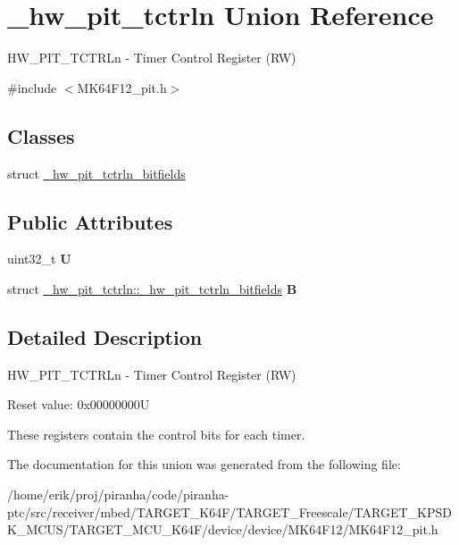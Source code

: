 \hypertarget{union__hw__pit__tctrln}{}\section{\+\_\+hw\+\_\+pit\+\_\+tctrln Union Reference}
\label{union__hw__pit__tctrln}


H\+W\+\_\+\+P\+I\+T\+\_\+\+T\+C\+T\+R\+Ln -\/ Timer Control Register (RW)  




{\ttfamily \#include $<$M\+K64\+F12\+\_\+pit.\+h$>$}

\subsection*{Classes}
\begin{DoxyCompactItemize}
\item 
struct \hyperlink{struct__hw__pit__tctrln_1_1__hw__pit__tctrln__bitfields}{\+\_\+hw\+\_\+pit\+\_\+tctrln\+\_\+bitfields}
\end{DoxyCompactItemize}
\subsection*{Public Attributes}
\begin{DoxyCompactItemize}
\item 
uint32\+\_\+t {\bfseries U}\hypertarget{union__hw__pit__tctrln_ad2a633ac922811734e79e02253bac6cf}{}\label{union__hw__pit__tctrln_ad2a633ac922811734e79e02253bac6cf}

\item 
struct \hyperlink{struct__hw__pit__tctrln_1_1__hw__pit__tctrln__bitfields}{\+\_\+hw\+\_\+pit\+\_\+tctrln\+::\+\_\+hw\+\_\+pit\+\_\+tctrln\+\_\+bitfields} {\bfseries B}\hypertarget{union__hw__pit__tctrln_aa5b3b405151ba1b985081e94538ba157}{}\label{union__hw__pit__tctrln_aa5b3b405151ba1b985081e94538ba157}

\end{DoxyCompactItemize}


\subsection{Detailed Description}
H\+W\+\_\+\+P\+I\+T\+\_\+\+T\+C\+T\+R\+Ln -\/ Timer Control Register (RW) 

Reset value\+: 0x00000000U

These registers contain the control bits for each timer. 

The documentation for this union was generated from the following file\+:\begin{DoxyCompactItemize}
\item 
/home/erik/proj/piranha/code/piranha-\/ptc/src/receiver/mbed/\+T\+A\+R\+G\+E\+T\+\_\+\+K64\+F/\+T\+A\+R\+G\+E\+T\+\_\+\+Freescale/\+T\+A\+R\+G\+E\+T\+\_\+\+K\+P\+S\+D\+K\+\_\+\+M\+C\+U\+S/\+T\+A\+R\+G\+E\+T\+\_\+\+M\+C\+U\+\_\+\+K64\+F/device/device/\+M\+K64\+F12/M\+K64\+F12\+\_\+pit.\+h\end{DoxyCompactItemize}
